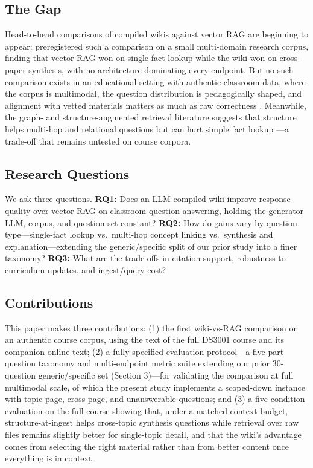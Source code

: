 \documentclass[letterpaper]{article} %
\begin{document}
\subsection{The Gap}

Head-to-head comparisons of compiled wikis against vector RAG are beginning to appear: \citet{cochran2026vector} preregistered such a comparison on a small multi-domain research corpus, finding that vector RAG won on single-fact lookup while the wiki won on cross-paper synthesis, with no architecture dominating every endpoint. But no such comparison exists in an educational setting with authentic classroom data, where the corpus is multimodal, the question distribution is pedagogically shaped, and alignment with vetted materials matters as much as raw correctness \citep{jain2025aligning}. Meanwhile, the graph- and structure-augmented retrieval literature suggests that structure helps multi-hop and relational questions but can hurt simple fact lookup \citep{peng2024graph,zhou2025indepth,aboulela2025exploring}---a trade-off that remains untested on course corpora.

\subsection{Research Questions}

We ask three questions. \textbf{RQ1:} Does an LLM-compiled wiki improve response quality over vector RAG on classroom question answering, holding the generator LLM, corpus, and question set constant? \textbf{RQ2:} How do gains vary by question type---single-fact lookup vs.\ multi-hop concept linking vs.\ synthesis and explanation---extending the generic/specific split of our prior study into a finer taxonomy? \textbf{RQ3:} What are the trade-offs in citation support, robustness to curriculum updates, and ingest/query cost?

\subsection{Contributions}

This paper makes three contributions: (1) the first wiki-vs-RAG comparison on an authentic course corpus, using the text of the full DS3001 course and its companion online text; (2) a fully specified evaluation protocol---a five-part question taxonomy and multi-endpoint metric suite extending our prior 30-question generic/specific set (Section 3)---for validating the comparison at full multimodal scale, of which the present study implements a scoped-down instance with topic-page, cross-page, and unanswerable questions; and (3) a five-condition evaluation on the full course showing that, under a matched context budget, structure-at-ingest helps cross-topic synthesis questions while retrieval over raw files remains slightly better for single-topic detail, and that the wiki's advantage comes from selecting the right material rather than from better content once everything is in context.
\end{document}
